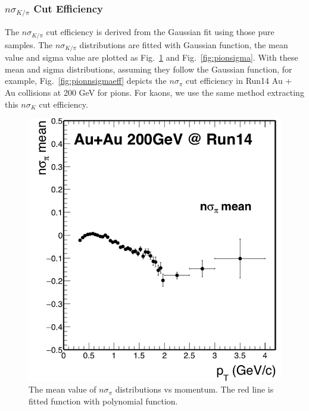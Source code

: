 \subsubsection{$n\sigma_{K/\pi}$ Cut Efficiency}

The $n\sigma_{K/\pi}$ cut efficiency is derived from the Gaussian fit using those pure samples. The $n\sigma_{K/\pi}$ distributions are fitted with Gaussian function, the mean value and sigma value are plotted as Fig.~\ref{fig:pionmean} and Fig.~\ref{fig:pionsigma}. With these mean and sigma distributions, assuming they follow the Gaussian function, for example, Fig.~\ref{fig:pionnsigmaeff} depicts the $n\sigma_{\pi}$ cut efficiency in Run14 Au + Au collisions at 200 GeV for pions. For kaons, we use the same method extracting this $n\sigma_{K}$ cut efficiency.

\begin{figure}[htbp]
\begin{minipage}[htbp]{0.5\linewidth}
\centering
\includegraphics[width=1.0\textwidth]{figure/Run14_D0HFT/nSigPion_mean.png}
\caption{The mean value of $n\sigma_{\pi}$ distributions vs momentum. The red line is fitted function with polynomial function. \label{fig:pionmean}}
\end{minipage}
\hfill
\begin{minipage}[htbp]{0.5\linewidth}

\end{minipage}
\end{figure}

